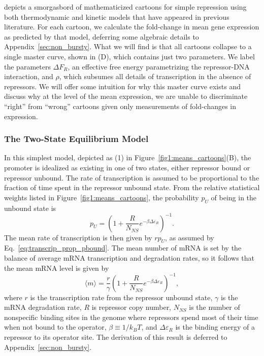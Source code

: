 depicts a smorgasbord of mathematicized cartoons for
simple repression using both thermodynamic and kinetic models that have appeared
in previous literature. For each cartoon, we calculate the fold-change in mean
gene expression as predicted by that model, deferring some algebraic details to
Appendix~\ref{sec:non_bursty}. What we will find is that all cartoons collapse
to a single master curve, shown in (D), which contains
just two parameters. We label the parameters $\Delta F_R$, an effective free
energy parametrizing the repressor-DNA interaction, and $\rho$, which subsumes
all details of transcription in the absence of repressors. We will offer some
intuition for why this master curve exists and discuss why at the level of the
mean expression, we are unable to discriminate ``right'' from ``wrong'' cartoons
given only measurements of fold-changes in expression.

\subsubsection{The Two-State Equilibrium Model}
In this simplest model, depicted as (1) in Figure~\ref{fig1:means_cartoons}(B),
the promoter is idealized as existing in one of two states, either repressor
bound or repressor unbound. The rate of transcription
is assumed to be proportional to the fraction of time spent
in the repressor unbound state.
From the relative statistical weights listed in
Figure~\ref{fig1:means_cartoons}, the probability $p_U$ of being in the
unbound state is
\begin{equation}
p_U = \left(1 + \frac{R}{N_{NS}} e^{-\beta\Delta\varepsilon_R}\right)^{-1}.
\end{equation}
The mean rate of transcription is then given by $r p_U$, as assumed by
Eq.~\ref{eq:transcrip_prop_pbound}. The mean number of mRNA is
set by the balance of average mRNA transcription and degradation rates,
so it follows that the mean mRNA level is given by
\begin{equation}
\langle m \rangle = \frac{r}{\gamma}
        \left(1 + \frac{R}{N_{NS}} e^{-\beta\Delta\varepsilon_R}\right)^{-1},
\end{equation}
where $r$ is the transcription rate from the repressor unbound state, $\gamma$
is the mRNA degradation rate, $R$ is repressor copy number, $N_{NS}$ is the
number of nonspecific binding sites in the genome where repressors spend most
of their time when not bound to the operator, $\beta \equiv 1/k_BT$, and
$\Delta\varepsilon_R$ is the binding energy of a repressor to its operator site.
The derivation of this result is deferred to Appendix~\ref{sec:non_bursty}.

